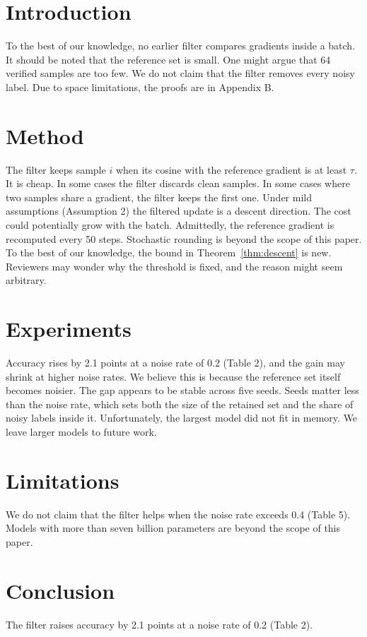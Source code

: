 \documentclass{article}
\begin{document}
\begin{abstract}
Noisy supervision makes a fine-tuned model memorize wrong labels. To the best of our knowledge, this is the first
filter that compares gradients inside a batch. At a noise rate of 0.2 the accuracy rises by 2.1 points (Table 2).
\end{abstract}

\section{Introduction}
To the best of our knowledge, no earlier filter compares gradients inside a batch.
It should be noted that the reference set is small.
One might argue that 64 verified samples are too few.
We do not claim that the filter removes every noisy label.
Due to space limitations, the proofs are in Appendix B.

\section{Method}
The filter keeps sample $i$ when its cosine with the reference gradient is at least $\tau$. It is cheap.
In some cases the filter discards clean samples.
In some cases where two samples share a gradient, the filter keeps the first one.
Under mild assumptions (Assumption 2) the filtered update is a descent direction.
The cost could potentially grow with the batch.
Admittedly, the reference gradient is recomputed every 50 steps.
Stochastic rounding is beyond the scope of this paper.
To the best of our knowledge, the bound in Theorem~\ref{thm:descent} is new.
Reviewers may wonder why the threshold is fixed, and the reason might seem arbitrary. %

\section{Experiments}
Accuracy rises by 2.1 points at a noise rate of 0.2 (Table 2), and the gain may shrink at higher noise rates.
We believe this is because the reference set itself becomes noisier.
The gap appears to be stable across five seeds. Seeds matter less than the noise rate, which sets both the size of the retained set and the share of noisy labels inside it.
Unfortunately, the largest model did not fit in memory.
We leave larger models to future work.

\section{Limitations}
We do not claim that the filter helps when the noise rate exceeds 0.4 (Table 5).
Models with more than seven billion parameters are beyond the scope of this paper.

\section{Conclusion}
The filter raises accuracy by 2.1 points at a noise rate of 0.2 (Table 2).
\end{document}
